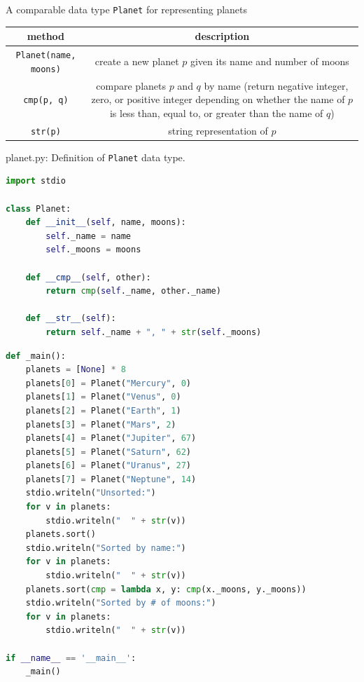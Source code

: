 \documentclass[8pt,a4paper,compress]{beamer}
\begin{document}
\begin{frame}[fragile]
\pause

A comparable data type \lstinline{Planet} for representing planets
\begin{center}
\begin{tabular}{cc}
method & description \\ \hline
\lstinline$Planet(name, moons)$ & create a new planet $p$ given its name and number of moons \\
\lstinline$cmp(p, q)$ & \makecell{compare planets $p$ and $q$ by name (return negative integer, zero, \\ or positive integer depending on whether the name of $p$ is less \\ than, equal to, or greater than the name of $q$)} \\
\lstinline$str(p)$ & string representation of $p$
\end{tabular} 
\end{center}
\end{frame}

\begin{frame}[fragile]
\pause

\begin{framed}
\tiny planet.py: Definition of \lstinline{Planet} data type.
\end{framed}

\begin{lstlisting}[language=Python]
import stdio

class Planet:
    def __init__(self, name, moons):
        self._name = name
        self._moons = moons

    def __cmp__(self, other):
        return cmp(self._name, other._name)
        
    def __str__(self):
        return self._name + ", " + str(self._moons)
\end{lstlisting}
\end{frame}

\begin{frame}[fragile]
\pause

\begin{lstlisting}[language=Python]
def _main():
    planets = [None] * 8
    planets[0] = Planet("Mercury", 0)
    planets[1] = Planet("Venus", 0)
    planets[2] = Planet("Earth", 1)
    planets[3] = Planet("Mars", 2)
    planets[4] = Planet("Jupiter", 67)
    planets[5] = Planet("Saturn", 62)
    planets[6] = Planet("Uranus", 27)
    planets[7] = Planet("Neptune", 14)
    stdio.writeln("Unsorted:")
    for v in planets:
        stdio.writeln("  " + str(v))
    planets.sort()
    stdio.writeln("Sorted by name:")
    for v in planets:
        stdio.writeln("  " + str(v))
    planets.sort(cmp = lambda x, y: cmp(x._moons, y._moons))
    stdio.writeln("Sorted by # of moons:")
    for v in planets:
        stdio.writeln("  " + str(v))

if __name__ == '__main__':
    _main()
\end{lstlisting}
\end{frame}
\end{document}
